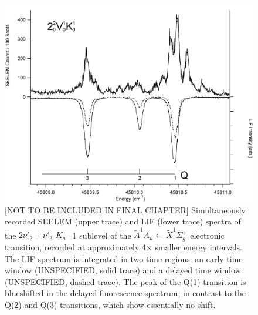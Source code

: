 \documentclass[12pt]{mitthesis}
\begin{document}
\begin{figure}
  \caption{[NOT TO BE INCLUDED IN FINAL CHAPTER] Simultaneously
    recorded SEELEM (upper trace) and LIF (lower trace) spectra of the
    $2\nu'_2+\nu'_3$ $K_a$=1 sublevel of the $\tilde{A}^1A_u
    \leftarrow \tilde{X} ^1\Sigma_g^+$ electronic transition, recorded
    at approximately 4$\times$ smaller energy intervals.  The LIF
    spectrum is integrated in two time regions: an early time window
    (UNSPECIFIED, solid trace) and a delayed time window (UNSPECIFIED,
    dashed trace).  The peak of the Q(1) transition is blueshifted in
    the delayed fluorescence spectrum, in contrast to the Q(2) and
    Q(3) transitions, which show essentially no shift.}
  \label{fig:spectrum-2231-q123}
  \centering
  \vspace{1cm}
  \includegraphics[width=6in]{spectrum-2231-Q123.png}
\end{figure}
\end{document}
